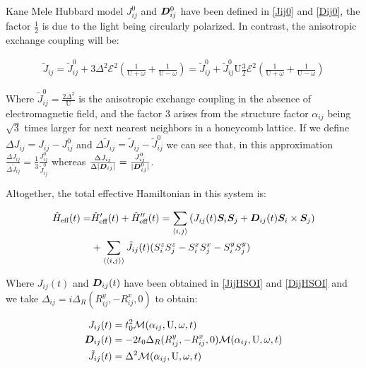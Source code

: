 \begin{section}{Kane Mele Hubbard model}
$J_{ij}^0$ and $\boldsymbol{D}_{ij}^0$ have been defined in \ref{Jij0} and \ref{Dij0}, the factor $\frac{1}{2}$ is due to the light being circularly polarized. In contrast, the anisotropic exchange coupling will be:

\begin{align*}
\tilde{J}_{ij} = \tilde{J}_{ij}^0 + 3 \Delta^2 \mathcal{E}^2 \left( \frac{1}{\text{U}+\omega} + \frac{1}{\text{U}-\omega} \right) = \tilde{J}_{ij}^0 + \tilde{J}_{ij}^0 \text{U} \frac{3}{2} \mathcal{E}^2 \left( \frac{1}{\text{U}+\omega} + \frac{1}{\text{U}-\omega} \right)
\end{align*}

Where $\tilde{J}_{ij}^0 = \frac{2\Delta^2}{\text{U}}$ is the anisotropic exchange coupling in the absence of electromagnetic field, and the factor $3$ arises from the structure factor $\alpha_{ij}$ being $\sqrt{3}$ times larger for next nearest neighbors in a honeycomb lattice. If we define $\Delta J_{ij} = J_{ij} - J_{ij}^0$ and $\Delta \tilde{J}_{ij} = \tilde{J}_{ij} - \tilde{J}_{ij}^0$ we can see that, in this approximation $\frac{\Delta J_{ij}}{\Delta \tilde{J}_{ij}} = \frac{1}{3}\frac{J_{ij}^0}{\tilde{J}_{ij}^0}$ whereas $\frac{\Delta J_{ij}}{\Delta |\boldsymbol{D}_{ij}|} = \frac{J_{ij}^0}{|\boldsymbol{D}_{ij}^0|}$.

Altogether, the total effective Hamiltonian in this system is:

\begin{align}
\hat{H}_{\text{eff}}(t) = &\hat{H}_{\text{eff}}'(t) + \hat{H}_{\text{eff}}''(t) = \sum_{\langle i,j \rangle} \left( J_{ij}(t)\boldsymbol{S}_i\boldsymbol{S}_j + \boldsymbol{D}_{ij}(t) \boldsymbol{S}_i \times \boldsymbol{S}_j \right) \nonumber \\
&+ \sum_{\langle \langle i,j \rangle \rangle} \tilde{J}_{ij}(t) (S_i^zS_j^z - S_i^xS_j^x - S_i^yS_j^y)
\end{align}

Where $J_{ij}(t)$ and $\boldsymbol{D}_{ij}(t)$ have been obtained in \ref{JijHSOI} and \ref{DijHSOI} and we take $\Delta_{ij} = i\Delta_R (R_{ij}^y, - R_{ij}^x, 0)$ to obtain:

\begin{align*}
J_{ij}(t) &= t_0^2\mathcal{M}(\alpha_{ij}, \text{U}, \omega, t) \\
\boldsymbol{D}_{ij}(t) &= -2t_0\Delta_R (R_{ij}^y, - R_{ij}^x, 0) \mathcal{M}(\alpha_{ij}, \text{U}, \omega, t) \\
\tilde{J}_{ij}(t) &= \Delta^2 \mathcal{M}(\alpha_{ij}, \text{U}, \omega, t)
\end{align*}

\end{section}
